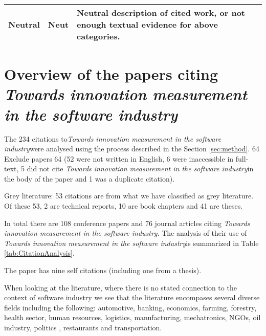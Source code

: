 \documentclass[sigplan]{acmart}
\newcommand{\theArticle}{\textit{Towards innovation measurement in the software industry}}
\begin{document}
\begin{table*}
\begin{tabular}{llp{12cm}}
		\midrule
		Neutral             & Neut         & Neutral description of cited work, or not enough textual evidence for above categories.\\
		\bottomrule
	\end{tabular}
\end{table*}

\section{Overview of the papers citing \theArticle}\label{sec:whocites}  %

The 234 citations to\theArticle  were analysed using the process described in the Section \ref{sec:method}. 64 
Exclude papers 64 (52  were not written in English, 6 were inaccessible in full-text, 5 did not cite \theArticle in the body of the paper and 1 was a duplicate citation).

Grey literature:  53 citations are from what we have classified as grey  literature. Of these 53, 2 are  technical reports, 10 are book chapters and 41 are theses.

In total there are 108 conference papers  and 76 journal articles citing \theArticle. The analysis of their use of \theArticle is summarized in Table \ref{tab:CitationAnalysis}. 

The paper has nine self citations (including one from a thesis). 

When looking at the literature, where there is no stated connection to the context of software industry we see that the literature encompases several diverse fields including the following: automotive, banking, economics, farming, forestry, health sector, human resources, logistics, manufacturing, mechatronics, NGOs, oil industry, politics , restaurants and transportation. 
\end{document}
